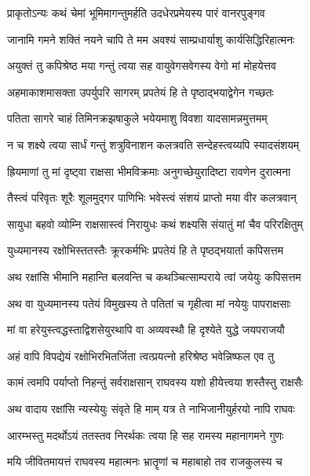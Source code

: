 \twolineshloka
{प्राकृतोऽन्यः कथं चेमां भूमिमागन्तुमर्हति}
{उदधेरप्रमेयस्य पारं वानरपुङ्गव} %

\twolineshloka
{जानामि गमने शक्तिं नयने चापि ते मम}
{अवश्यं साम्प्रधार्याशु कार्यसिद्धिरिहात्मनः} %

\twolineshloka
{अयुक्तं तु कपिश्रेष्ठ मया गन्तुं त्वया सह}
{वायुवेगसवेगस्य वेगो मां मोहयेत्तव} %

\twolineshloka
{अहमाकाशमासक्ता उपर्युपरि सागरम्}
{प्रपतेयं हि ते पृष्ठाद्भयाद्वेगेन गच्छतः} %

\twolineshloka
{पतिता सागरे चाहं तिमिनक्रझषाकुले}
{भयेयमाशु विवशा यादसामन्नमुत्तमम्} %

\twolineshloka
{न च शक्ष्ये त्वया सार्धं गन्तुं शत्रुविनाशन}
{कलत्रवति सन्देहस्त्वय्यपि स्यादसंशयम्} %

\twolineshloka
{ह्रियमाणां तु मां दृष्ट्वा राक्षसा भीमविक्रमाः}
{अनुगच्छेयुरादिष्टा रावणेन दुरात्मना} %

\twolineshloka
{तैस्त्वं परिवृतः शूरैः शूलमुद्गर पाणिभिः}
{भवेस्त्वं संशयं प्राप्तो मया वीर कलत्रवान्} %

\twolineshloka
{सायुधा बहवो व्योम्नि राक्षसास्त्वं निरायुधः}
{कथं शक्ष्यसि संयातुं मां चैव परिरक्षितुम्} %

\twolineshloka
{युध्यमानस्य रक्षोभिस्ततस्तैः क्रूरकर्मभिः}
{प्रपतेयं हि ते पृष्ठद्भयार्ता कपिसत्तम} %

\twolineshloka
{अथ रक्षांसि भीमानि महान्ति बलवन्ति च}
{कथञ्चित्साम्पराये त्वां जयेयुः कपिसत्तम} %

\twolineshloka
{अथ वा युध्यमानस्य पतेयं विमुखस्य ते}
{पतितां च गृहीत्वा मां नयेयुः पापराक्षसाः} %

\twolineshloka
{मां वा हरेयुस्त्वद्धस्ताद्विशसेयुरथापि वा}
{अव्यवस्थौ हि दृश्येते युद्धे जयपराजयौ} %

\twolineshloka
{अहं वापि विपद्येयं रक्षोभिरभितर्जिता}
{त्वत्प्रयत्नो हरिश्रेष्ठ भवेन्निष्फल एव तु} %

\twolineshloka
{कामं त्वमपि पर्याप्तो निहन्तुं सर्वराक्षसान्}
{राघवस्य यशो हीयेत्त्वया शस्तैस्तु राक्षसैः} %

\twolineshloka
{अथ वादाय रक्षांसि न्यस्येयुः संवृते हि माम्}
{यत्र ते नाभिजानीयुर्हरयो नापि राघवः} %

\twolineshloka
{आरम्भस्तु मदर्थोऽयं ततस्तव निरर्थकः}
{त्वया हि सह रामस्य महानागमने गुणः} %

\twolineshloka
{मयि जीवितमायत्तं राघवस्य महात्मनः}
{भ्रातॄणां च महाबाहो तव राजकुलस्य च} %

